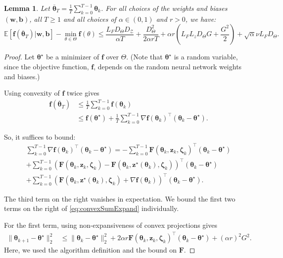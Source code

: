 \documentclass[twoside]{article}
\newtheorem{lemma}{Lemma}
\theoremstyle{definition}
\newcommand{\E}{\mathbb{E}}
\newcommand{\cZ}{\mathcal{Z}}
\newcommand{\1}[1]{\scalebox{1.25}{$\mathds{1}$}\left[#1\right]}
\begin{document}
\begin{lemma}
\label{lem:cvx}
Let $\overline{\bm{\theta}}_T=\frac{1}{T}\sum_{k=0}^{T-1}\bm{\theta}_k$. For all choices of the weights and biases $(\bm{w},\bm{b})$, all $T\ge 1$ and all choices of $\alpha \in (0,1)$ and $r>0$, we have:
\begin{equation*}
\E[\bm{f}(\overline{\bm{\theta}}_T)|\bm{w},\bm{b}]-\min_{\theta\in\Theta}\bm{f}(\theta)\le 
 \frac{L_F D_{\Theta} D_{\cZ}}{\alpha T}+\frac{D_{\Theta}^2}{2\alpha r T}+
\alpha r\left(
L_FL_z D_{\Theta}G+\frac{G^2}{2}
\right)
+\sqrt{\alpha}\nu L_F D_{\Theta}.
\end{equation*}
\end{lemma}
\begin{proof}

Let $\bm{\theta}^\star$ be a minimizer of $\bm{f}$ over $\Theta$. (Note that $\bm{\theta}^\star$ is a random variable, since the objective function, $\bm{f}$, depends on the random neural network weights and biases.)

Using convexity of $\bm{f}$ twice gives
\begin{align*}
\bm{f}(\overline{\bm{\theta}}_T)&\le \frac{1}{T}\sum_{k=0}^{T-1}\bm{f}(\bm{\theta}_k) \\
&\le \bm{f}(\bm{\theta}^\star)+\frac{1}{T}\sum_{k=0}^{T-1}
\nabla \bm{f}(\bm{\theta}_k)^\top (\bm{\theta}_k-\bm{\theta}^\star).
\end{align*}

So, it suffices to bound:
\begin{multline}
\label{eq:convexSumExpand}
\sum_{k=0}^{T-1}
\nabla \bm{f}(\bm{\theta}_k)^\top (\bm{\theta}_k-\bm{\theta}^\star)
=-\sum_{k=0}^{T-1}\bm{F}(\bm{\theta}_k,\bm{z}_k,\bm{\zeta}_k)^\top (\bm{\theta}_k-\bm{\theta}^\star)\\
+\sum_{k=0}^{T-1}\left(\bm{F}(\bm{\theta}_k,\bm{z}_k,\bm{\zeta}_k)-
\bm{F}(\bm{\theta}_k,\bm{z}^\star(\bm{\theta}_k),\bm{\zeta}_k)
\right)^\top (\bm{\theta}_k-\bm{\theta}^\star)
\\
+\sum_{k=0}^{T-1}
\left(\bm{F}(\bm{\theta}_k,\bm{z}^\star(\bm{\theta}_k),\bm{\zeta}_k)+
\nabla \bm{f}(\bm{\theta}_k)
\right)^\top (\bm{\theta}_k-\bm{\theta}^\star).
\end{multline}

The third term on the right vanishes in expectation.
We bound the first two terms on the right of \eqref{eq:convexSumExpand} individually.

For the first term, using non-expansiveness of convex projections gives
\begin{align*}
\|\bm{\theta}_{k+1}-\bm{\theta}^\star\|_2^2
&\le \|\bm{\theta}_k-\bm{\theta}^\star\|_2^2+2\alpha r \bm{F}(\bm{\theta}_k,\bm{z}_k,\bm{\zeta}_k)^\top (\bm{\theta}_k-\bm{\theta}^\star) 
+(\alpha r)^2 G^2.
\end{align*}
Here, we used the algorithm definition and the bound on $\bm{F}$.


\end{proof}
\end{document}
